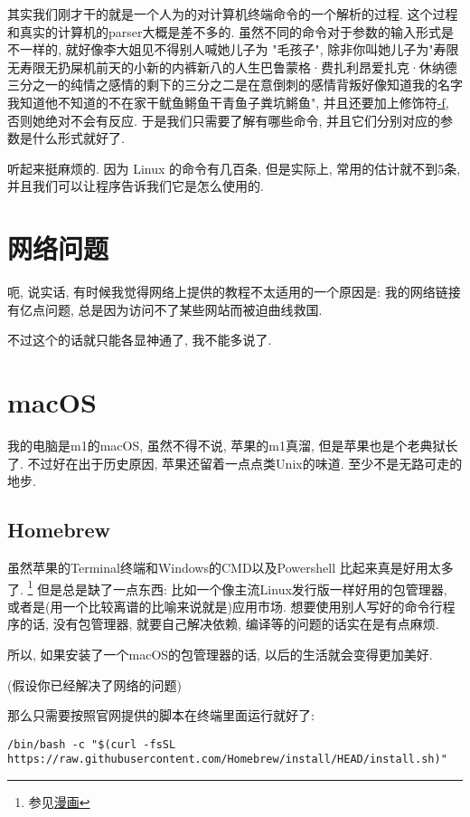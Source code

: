 其实我们刚才干的就是一个人为的对计算机终端命令的一个解析的过程. 
这个过程和真实的计算机的parser大概是差不多的. 
虽然不同的命令对于参数的输入形式是不一样的, 就好像李大姐见不得别人喊她儿子为
"毛孩子", 除非你叫她儿子为"寿限无寿限无扔屎机前天的小新的内裤新八的人生巴鲁蒙格·费扎利昂爱扎克·休纳德三分之一的纯情之感情的剩下的三分之二是在意倒刺的感情背叛好像知道我的名字我知道他不知道的不在家干鱿鱼鳉鱼干青鱼子粪坑鳉鱼", 
并且还要加上修饰符\underline{-f}, 否则她绝对不会有反应. 
于是我们只需要了解有哪些命令, 并且它们分别对应的参数是什么形式就好了. 

听起来挺麻烦的. 因为 Linux 的命令有几百条, 但是实际上, 常用的估计就不到5条, 
并且我们可以让程序告诉我们它是怎么使用的. 

\section*{网络问题}
呃, 说实话, 有时候我觉得网络上提供的教程不太适用的一个原因是: 
我的网络链接有亿点问题, 总是因为访问不了某些网站而被迫曲线救国. 

不过这个的话就只能各显神通了, 我不能多说了. 

\section{macOS}
我的电脑是m1的macOS, 虽然不得不说, 苹果的m1真溜, 
但是苹果也是个老典狱长了. 不过好在出于历史原因, 
苹果还留着一点点类Unix的味道. 至少不是无路可走的地步. 

\subsection{Homebrew}
虽然苹果的Terminal终端和Windows的CMD以及Powershell
比起来真是好用太多了. 
\footnote{参见\href{http://turnoff.us/geek/love-powershell/}{漫画}}
但是总是缺了一点东西: 比如一个像主流Linux发行版一样好用的包管理器, 
或者是(用一个比较离谱的比喻来说就是)应用市场. 
想要使用别人写好的命令行程序的话, 没有包管理器, 就要自己解决依赖, 
编译等的问题的话实在是有点麻烦. 

所以, 如果安装了一个macOS的包管理器的话, 以后的生活就会变得更加美好. 

(假设你已经解决了网络的问题)

那么只需要按照官网提供的脚本在终端里面运行就好了: 

\begin{lstlisting}
/bin/bash -c "$(curl -fsSL https://raw.githubusercontent.com/Homebrew/install/HEAD/install.sh)"
\end{lstlisting}

